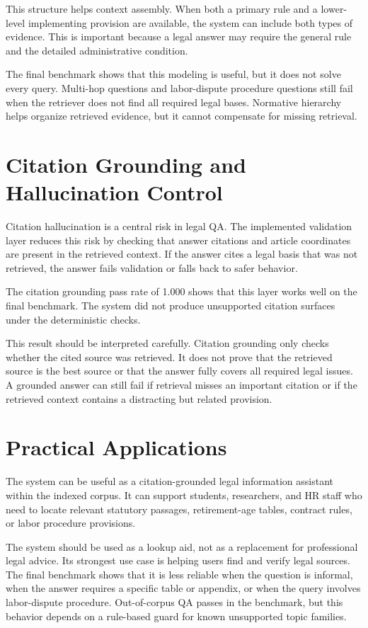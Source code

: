 This structure helps context assembly. When both a primary rule and a lower-level implementing provision are available, the system can include both types of evidence. This is important because a legal answer may require the general rule and the detailed administrative condition.

The final benchmark shows that this modeling is useful, but it does not solve every query. Multi-hop questions and labor-dispute procedure questions still fail when the retriever does not find all required legal bases. Normative hierarchy helps organize retrieved evidence, but it cannot compensate for missing retrieval.

\section{Citation Grounding and Hallucination Control}
Citation hallucination is a central risk in legal QA. The implemented validation layer reduces this risk by checking that answer citations and article coordinates are present in the retrieved context. If the answer cites a legal basis that was not retrieved, the answer fails validation or falls back to safer behavior.

The citation grounding pass rate of 1.000 shows that this layer works well on the final benchmark. The system did not produce unsupported citation surfaces under the deterministic checks.

This result should be interpreted carefully. Citation grounding only checks whether the cited source was retrieved. It does not prove that the retrieved source is the best source or that the answer fully covers all required legal issues. A grounded answer can still fail if retrieval misses an important citation or if the retrieved context contains a distracting but related provision.

\section{Practical Applications}
The system can be useful as a citation-grounded legal information assistant within the indexed corpus. It can support students, researchers, and HR staff who need to locate relevant statutory passages, retirement-age tables, contract rules, or labor procedure provisions.

The system should be used as a lookup aid, not as a replacement for professional legal advice. Its strongest use case is helping users find and verify legal sources. The final benchmark shows that it is less reliable when the question is informal, when the answer requires a specific table or appendix, or when the query involves labor-dispute procedure. Out-of-corpus QA passes in the benchmark, but this behavior depends on a rule-based guard for known unsupported topic families.

